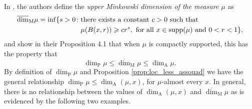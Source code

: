 \documentclass{PRM}
\newcommand{\updim}{\overline{\dim}}
\newcommand{\adim}{\dim_{\mathrm{A}}}
\theoremstyle{plain}
\theoremstyle{definition}
\theoremstyle{remark}
\begin{document}
In \cite{KFF}, the authors define the \emph{upper Minkowski dimension of the measure $\mu$} as
\begin{align*}
    \updim_{\mathrm{M}}\mu=\inf\{s>0\colon &\textnormal{there exists a constant }c>0\textnormal{ such that}\\
    &\mu(B(x,r))\geq cr^s,  \textnormal{ for all }x\in \text{supp}(\mu)\textnormal{ and }0<r<1\},
\end{align*}
and show in their Proposition 4.1 that when $\mu$ is compactly supported, this has the property that
\begin{equation*}
    \dim_{\mathrm{P}}\mu\leq \updim_{\mathrm{M}}\mu\leq \dim_{\mathrm{A}}\mu.
\end{equation*}
By definition of $\dim_{\mathrm{P}}\mu$ and Proposition \ref{prop:loc_less_assouad} we have the general relationship $\dim_{\mathrm{P}}\mu\leq\dim_{\mathrm{A}}(\mu,x)$, for $\mu$-almost every $x$. In general, there is no relationship between the values of $\adim(\mu,x)$ and $\updim_{\mathrm{M}}\mu$ as is evidenced by the following two examples.
\end{document}
